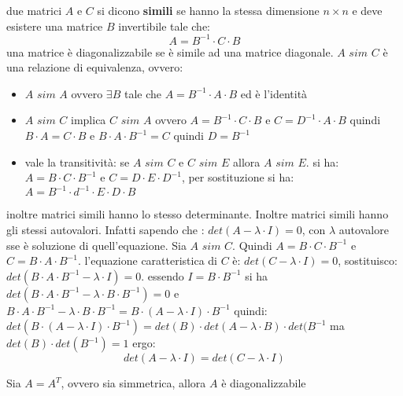 \documentclass[a4paper,12pt, oneside]{book}
\begin{document}
\begin{definizione}
due matrici $A$ e $C$ si dicono \textbf{simili} se hanno la stessa dimensione $n\times n$ e deve esistere una matrice $B$ invertibile tale che:
$$A=B^{-1}\cdot C \cdot B$$
una matrice è diagonalizzabile se è simile ad una matrice diagonale.
$A \,\,sim\,\, C$ è una relazione di equivalenza, ovvero:
\begin{itemize}
\item $A\,\, sim \,\, A$ ovvero $\exists B$ tale che $A=B^{-1}\cdot A\cdot B$ ed è l'identità
\item $A\,\, sim \,\, C$ implica $C\,\, sim \,\, A$ ovvero $A=B^{-1}\cdot C\cdot B$ e $C=D^{-1}\cdot A\cdot B$ quindi $B\cdot A=C\cdot B$ e $B\cdot A\cdot B^{-1}=C$ quindi $D=B^{-1}$
\item vale la transitività: se $A\,\, sim \,\, C$ e $C\,\, sim \,\, E$ allora $A\,\, sim \,\, E$. si ha: $A=B\cdot C\cdot B^{-1}$ e $C=D\cdot E\cdot D^{-1}$, per sostituzione si ha: $A=B^{-1}\cdot d^{-1}\cdot E\cdot D\cdot B$
\end{itemize}
inoltre matrici simili hanno lo stesso determinante. Inoltre matrici simili hanno gli stessi autovalori. Infatti sapendo che : $det(A-\lambda\cdot I)=0$, con $\lambda$ autovalore sse è soluzione di quell'equazione. Sia $A\,\, sim \,\, C$. Quindi $A=B\cdot C\cdot B^{-1}$ e $C=B\cdot A\cdot B^{-1}$. l'equazione caratteristica di $C$ è: $det(C-\lambda\cdot I)=0$, sostituisco: $det(B\cdot A\cdot B^{-1}-\lambda\cdot I)=0$. essendo $I=B\cdot B^{-1}$ si ha $det(B\cdot A\cdot B^{-1}-\lambda\cdot B\cdot B^{-1})=0$ e $B\cdot A\cdot B^{-1}-\lambda\cdot B\cdot B^{-1}=B\cdot (A-\lambda\cdot I)\cdot B^{-1}$ quindi: $det(B\cdot (A-\lambda\cdot I)\cdot B^{-1})=det(B)\cdot det(A-\lambda\cdot B)\cdot det(B^{-1}$ ma $det(B)\cdot det(B^{-1})=1$ ergo:
$$det(A-\lambda\cdot I)=det(C-\lambda\cdot I)$$
\end{definizione}
\begin{teorema}
Sia $A=A^T$, ovvero sia simmetrica, allora $A$ è diagonalizzabile
\end{teorema}
\end{document}

